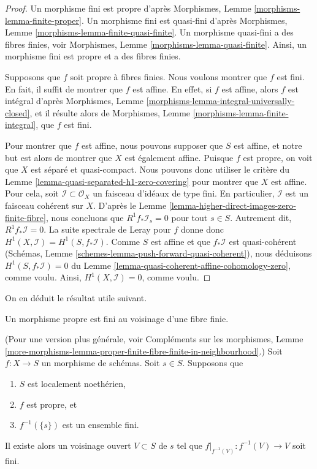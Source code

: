 \begin{proof}
Un morphisme fini est propre d'après
Morphismes, Lemme \ref{morphisms-lemma-finite-proper}.
Un morphisme fini est quasi-fini d'après
Morphismes, Lemme \ref{morphisms-lemma-finite-quasi-finite}.
Un morphisme quasi-fini a des fibres finies, voir
Morphismes, Lemme \ref{morphisms-lemma-quasi-finite}.
Ainsi, un morphisme fini est propre et a des fibres finies.

\medskip\noindent
Supposons que $f$ soit propre à fibres finies.
Nous voulons montrer que $f$ est fini.
En fait, il suffit de montrer que $f$ est affine.
En effet, si $f$ est affine, alors
$f$ est intégral d'après
Morphismes, Lemme \ref{morphisms-lemma-integral-universally-closed},
et il résulte alors de
Morphismes, Lemme \ref{morphisms-lemma-finite-integral},
que $f$ est fini.

\medskip\noindent
Pour montrer que $f$ est affine, nous pouvons supposer que $S$ est affine, et notre
but est alors de montrer que $X$ est également affine.
Puisque $f$ est propre, on voit que $X$ est séparé et quasi-compact.
Nous pouvons donc utiliser le critère du
Lemme \ref{lemma-quasi-separated-h1-zero-covering} pour montrer que $X$
est affine. Pour cela, soit $\mathcal{I} \subset \mathcal{O}_X$
un faisceau d'idéaux de type fini. En particulier, $\mathcal{I}$ est
un faisceau cohérent sur $X$. D'après le
Lemme \ref{lemma-higher-direct-images-zero-finite-fibre}, nous concluons que
$R^1f_*\mathcal{I}_s = 0$ pour tout $s \in S$.
Autrement dit, $R^1f_*\mathcal{I} = 0$. La suite spectrale de Leray
pour $f$ donne donc
$H^1(X , \mathcal{I}) = H^1(S, f_*\mathcal{I})$.
Comme $S$ est affine et que $f_*\mathcal{I}$ est quasi-cohérent
(Schémas, Lemme \ref{schemes-lemma-push-forward-quasi-coherent}),
nous déduisons $H^1(S, f_*\mathcal{I}) = 0$
du Lemme \ref{lemma-quasi-coherent-affine-cohomology-zero},
comme voulu. Ainsi, $H^1(X, \mathcal{I}) = 0$, comme voulu.
\end{proof}

\noindent
On en déduit le résultat utile suivant.

\begin{lemma}
\label{lemma-proper-finite-fibre-finite-in-neighbourhood}
\begin{slogan}
Un morphisme propre est fini au voisinage d'une fibre finie.
\end{slogan}
(Pour une version plus générale, voir
Compléments sur les morphismes,
Lemme \ref{more-morphisms-lemma-proper-finite-fibre-finite-in-neighbourhood}.)
Soit $f : X \to S$ un morphisme de schémas.
Soit $s \in S$.
Supposons que
\begin{enumerate}
\item $S$ est localement noethérien,
\item $f$ est propre, et
\item $f^{-1}(\{s\})$ est un ensemble fini.
\end{enumerate}
Il existe alors un voisinage ouvert $V \subset S$ de $s$
tel que $f|_{f^{-1}(V)} : f^{-1}(V) \to V$ soit fini.
\end{lemma}

